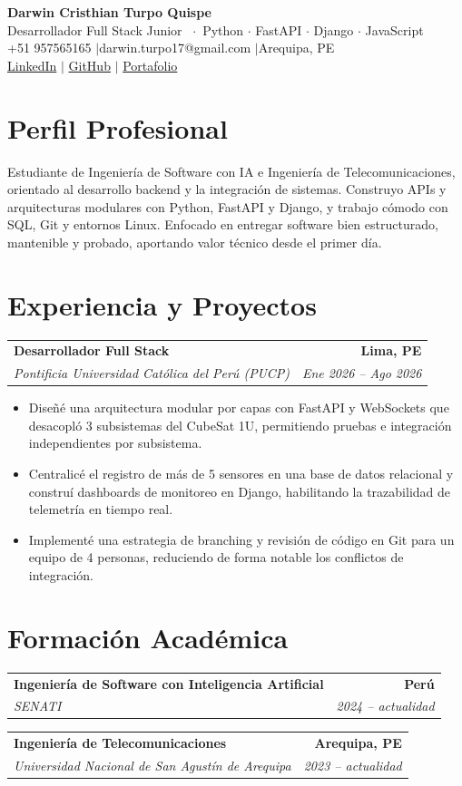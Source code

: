 \documentclass[11pt,a4paper]{article}
\makeatletter
\newcommand{\entry}[4]{%
  \noindent\begin{tabular*}{\textwidth}{@{}l@{\extracolsep{\fill}}r@{}}
  \textbf{#1} & \textbf{#4} \\
  \textit{#2} & \textit{#3} \\
  \end{tabular*}\vspace{0.3ex}%
}
\makeatother
\begin{document}
\begin{center}
  {\LARGE\bfseries Darwin Cristhian Turpo Quispe}\\[0.4ex]
  {\large Desarrollador Full Stack Junior \ $\cdot$\ Python $\cdot$ FastAPI $\cdot$ Django $\cdot$ JavaScript}\\[0.9ex]
  +51 957565165 \quad$\vert$\quad darwin.turpo17@gmail.com \quad$\vert$\quad Arequipa, PE\\[0.4ex]
  \href{https://linkedin.com/in/darwin-turpo-813083313}{LinkedIn}
  \quad$\vert$\quad
  \href{https://github.com/darwintq}{GitHub}
  \quad$\vert$\quad
  \href{https://portfolio-ai-cyan-seven.vercel.app/}{Portafolio}
\end{center}

\section{Perfil Profesional}
Estudiante de Ingeniería de Software con IA e Ingeniería de Telecomunicaciones, orientado al desarrollo backend y la integración de sistemas. Construyo APIs y arquitecturas modulares con Python, FastAPI y Django, y trabajo cómodo con SQL, Git y entornos Linux. Enfocado en entregar software bien estructurado, mantenible y probado, aportando valor técnico desde el primer día.

\section{Experiencia y Proyectos}
\entry{Desarrollador Full Stack}{Pontificia Universidad Católica del Perú (PUCP)}{Ene 2026 -- Ago 2026}{Lima, PE}
\begin{itemize}
  \item Diseñé una arquitectura modular por capas con FastAPI y WebSockets que desacopló 3 subsistemas del CubeSat 1U, permitiendo pruebas e integración independientes por subsistema.
  \item Centralicé el registro de más de 5 sensores en una base de datos relacional y construí dashboards de monitoreo en Django, habilitando la trazabilidad de telemetría en tiempo real.
  \item Implementé una estrategia de branching y revisión de código en Git para un equipo de 4 personas, reduciendo de forma notable los conflictos de integración.
\end{itemize}

\section{Formación Académica}
\entry{Ingeniería de Software con Inteligencia Artificial}{SENATI}{2024 -- actualidad}{Perú}
\vspace{0.6ex}
\entry{Ingeniería de Telecomunicaciones}{Universidad Nacional de San Agustín de Arequipa}{2023 -- actualidad}{Arequipa, PE}
\end{document}
